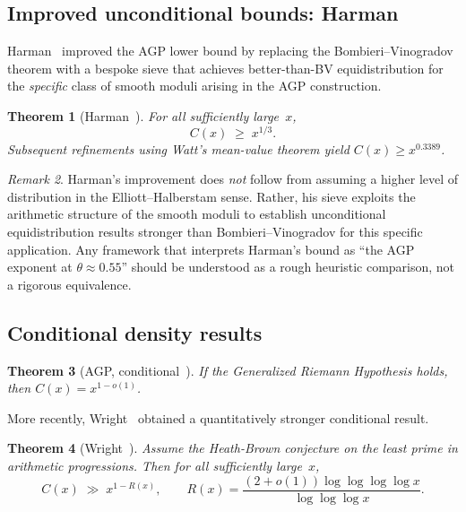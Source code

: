 \documentclass[12pt]{amsart}
\theoremstyle{plain}
\newtheorem{theorem}{Theorem}[section]
\theoremstyle{definition}
\theoremstyle{remark}
\newtheorem{remark}[theorem]{Remark}
\begin{document}
\subsection{Improved unconditional bounds: Harman}\label{subsec:harman}

Harman~\cite{harman2005} improved the AGP lower bound by replacing
the Bombieri--Vinogradov theorem with a bespoke sieve that achieves
better-than-BV equidistribution for the \emph{specific} class of
smooth moduli arising in the AGP construction.

\begin{theorem}[Harman~\cite{harman2005}]\label{thm:harman}
For all sufficiently large~$x$,
\[
  C(x) \;\ge\; x^{1/3}.
\]
Subsequent refinements using Watt's mean-value theorem yield
$C(x)\ge x^{0.3389}$.
\end{theorem}

\begin{remark}\label{rem:harman_not_eh}
Harman's improvement does \emph{not} follow from assuming a higher
level of distribution in the Elliott--Halberstam sense.  Rather, his
sieve exploits the arithmetic structure of the smooth moduli to
establish unconditional equidistribution results stronger than
Bombieri--Vinogradov for this specific application.  Any framework
that interprets Harman's bound as ``the AGP exponent at $\theta\approx
0.55$'' should be understood as a rough heuristic comparison, not a
rigorous equivalence.
\end{remark}

\subsection{Conditional density results}\label{subsec:conditional}

\begin{theorem}[AGP, conditional~\cite{agp1994}]
\label{thm:agp_conditional}
If the Generalized Riemann Hypothesis holds, then
$C(x)=x^{1-o(1)}$.
\end{theorem}

More recently, Wright~\cite{wright2020} obtained a quantitatively
stronger conditional result.

\begin{theorem}[Wright~\cite{wright2020}]\label{thm:wright}
Assume the Heath-Brown conjecture on the least prime in arithmetic
progressions.  Then for all sufficiently large~$x$,
\[
  C(x) \;\gg\; x^{1-R(x)}, \qquad
  R(x) = \frac{(2+o(1))\log\log\log\log x}{\log\log\log x}.
\]
\end{theorem}
\end{document}
